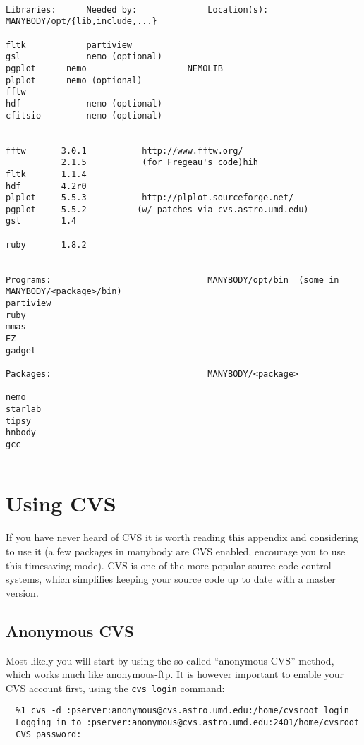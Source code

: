 \footnotesize\begin{verbatim}

Libraries:      Needed by:              Location(s): MANYBODY/opt/{lib,include,...}

fltk            partiview
gsl             nemo (optional)
pgplot		nemo                    NEMOLIB
plplot		nemo (optional)
fftw            
hdf             nemo (optional)
cfitsio         nemo (optional)


fftw       3.0.1           http://www.fftw.org/ 
           2.1.5           (for Fregeau's code)hih
fltk	   1.1.4
hdf        4.2r0
plplot     5.5.3           http://plplot.sourceforge.net/   
pgplot     5.5.2          (w/ patches via cvs.astro.umd.edu)
gsl        1.4

ruby	   1.8.2


Programs:                               MANYBODY/opt/bin  (some in MANYBODY/<package>/bin)
partiview
ruby
mmas
EZ
gadget

Packages:                               MANYBODY/<package>

nemo
starlab
tipsy
hnbody
gcc


\end{verbatim}\normalsize



\chapter                {Using CVS}

If you have never heard of CVS it is worth reading
this appendix and considering to use it (a few packages
in manybody are CVS enabled, encourage you to use this timesaving mode).
CVS is one of the more popular
source code control systems, which simplifies keeping your source code
up to date with a master version. 

\section{Anonymous CVS}

Most likely you will start by using the so-called ``anonymous CVS''
method, which works much like anonymous-ftp.  It is  however
important to enable your CVS account first, using the {\tt cvs login}
command:

\footnotesize\begin{verbatim}
  %1 cvs -d :pserver:anonymous@cvs.astro.umd.edu:/home/cvsroot login
  Logging in to :pserver:anonymous@cvs.astro.umd.edu:2401/home/cvsroot
  CVS password: 
\end{verbatim}\normalsize

